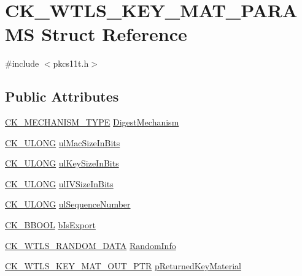\hypertarget{struct_c_k___w_t_l_s___k_e_y___m_a_t___p_a_r_a_m_s}{}\section{C\+K\+\_\+\+W\+T\+L\+S\+\_\+\+K\+E\+Y\+\_\+\+M\+A\+T\+\_\+\+P\+A\+R\+A\+MS Struct Reference}
\label{struct_c_k___w_t_l_s___k_e_y___m_a_t___p_a_r_a_m_s}


{\ttfamily \#include $<$pkcs11t.\+h$>$}

\subsection*{Public Attributes}
\begin{DoxyCompactItemize}
\item 
\hyperlink{pkcs11t_8h_aaf1084907f5cc09a3e0b85ab022a240d}{C\+K\+\_\+\+M\+E\+C\+H\+A\+N\+I\+S\+M\+\_\+\+T\+Y\+PE} \hyperlink{struct_c_k___w_t_l_s___k_e_y___m_a_t___p_a_r_a_m_s_aea2b231b8552ac86c6dc0434b0502e2b}{Digest\+Mechanism}
\item 
\hyperlink{pkcs11t_8h_a35181858a3b7a0a81f49d180d8f446ef}{C\+K\+\_\+\+U\+L\+O\+NG} \hyperlink{struct_c_k___w_t_l_s___k_e_y___m_a_t___p_a_r_a_m_s_aa4891256daf5ff764421a7b967b525b9}{ul\+Mac\+Size\+In\+Bits}
\item 
\hyperlink{pkcs11t_8h_a35181858a3b7a0a81f49d180d8f446ef}{C\+K\+\_\+\+U\+L\+O\+NG} \hyperlink{struct_c_k___w_t_l_s___k_e_y___m_a_t___p_a_r_a_m_s_a1fd499c0edb2cd4fd1877301e554ffd7}{ul\+Key\+Size\+In\+Bits}
\item 
\hyperlink{pkcs11t_8h_a35181858a3b7a0a81f49d180d8f446ef}{C\+K\+\_\+\+U\+L\+O\+NG} \hyperlink{struct_c_k___w_t_l_s___k_e_y___m_a_t___p_a_r_a_m_s_a37e7d3d8619b180e6b0e6442006b2f43}{ul\+I\+V\+Size\+In\+Bits}
\item 
\hyperlink{pkcs11t_8h_a35181858a3b7a0a81f49d180d8f446ef}{C\+K\+\_\+\+U\+L\+O\+NG} \hyperlink{struct_c_k___w_t_l_s___k_e_y___m_a_t___p_a_r_a_m_s_aa0827a5a42d3e3679898636dee382c59}{ul\+Sequence\+Number}
\item 
\hyperlink{pkcs11t_8h_abd07a1bba363f8083080b9328e67b491}{C\+K\+\_\+\+B\+B\+O\+OL} \hyperlink{struct_c_k___w_t_l_s___k_e_y___m_a_t___p_a_r_a_m_s_acac1b1ee6edf25ca628f6e1c31cd90ca}{b\+Is\+Export}
\item 
\hyperlink{struct_c_k___w_t_l_s___r_a_n_d_o_m___d_a_t_a}{C\+K\+\_\+\+W\+T\+L\+S\+\_\+\+R\+A\+N\+D\+O\+M\+\_\+\+D\+A\+TA} \hyperlink{struct_c_k___w_t_l_s___k_e_y___m_a_t___p_a_r_a_m_s_ac73d57990771b7c66499385866a15641}{Random\+Info}
\item 
\hyperlink{pkcs11t_8h_a34fa0dcdd839f18a057a5b6eec0fbf91}{C\+K\+\_\+\+W\+T\+L\+S\+\_\+\+K\+E\+Y\+\_\+\+M\+A\+T\+\_\+\+O\+U\+T\+\_\+\+P\+TR} \hyperlink{struct_c_k___w_t_l_s___k_e_y___m_a_t___p_a_r_a_m_s_a2ce311c67e150c9a9ada167e8492db94}{p\+Returned\+Key\+Material}
\end{DoxyCompactItemize}


